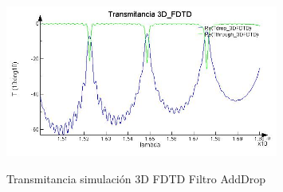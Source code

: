 \begin{figure}[h!]
\caption{Transmitancia simulación 3D FDTD Filtro AddDrop}
\centering
\includegraphics[width=0.8\textwidth,natwidth=641,natheight=356]{figs/lum_T_FDTD.jpg}
\label{fig:lum_t_fdtd_ad}
\end{figure} 

